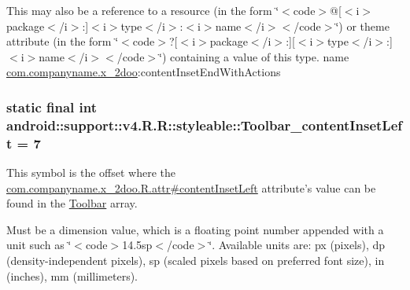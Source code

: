 This may also be a reference to a resource (in the form \char`\"{}$<$code$>$@\mbox{[}$<$i$>$package$<$/i$>$:\mbox{]}$<$i$>$type$<$/i$>$:$<$i$>$name$<$/i$>$$<$/code$>$\char`\"{}) or theme attribute (in the form \char`\"{}$<$code$>$?\mbox{[}$<$i$>$package$<$/i$>$:\mbox{]}\mbox{[}$<$i$>$type$<$/i$>$:\mbox{]}$<$i$>$name$<$/i$>$$<$/code$>$\char`\"{}) containing a value of this type.  name \hyperlink{namespacecom_1_1companyname_1_1x__2doo}{com.companyname.x\_\-2doo}:contentInsetEndWithActions \hypertarget{classandroid_1_1support_1_1v4_1_1_r_1_1styleable_58d0345a39808d32a1f60119991bb07e}{
\subsubsection[{Toolbar\_\-contentInsetLeft}]{\setlength{\rightskip}{0pt plus 5cm}static final int android::support::v4.R.R::styleable::Toolbar\_\-contentInsetLeft = 7}}
\label{classandroid_1_1support_1_1v4_1_1_r_1_1styleable_58d0345a39808d32a1f60119991bb07e}


This symbol is the offset where the \hyperlink{classcom_1_1companyname_1_1x__2doo_1_1_r_1_1attr_6c3ee0e73b74ea9e227ad51936654195}{com.companyname.x\_\-2doo.R.attr\#contentInsetLeft} attribute's value can be found in the \hyperlink{classandroid_1_1support_1_1v4_1_1_r_1_1styleable_0646d71cfbd4a8645c7d805b33e1c574}{Toolbar} array.

Must be a dimension value, which is a floating point number appended with a unit such as \char`\"{}$<$code$>$14.5sp$<$/code$>$\char`\"{}. Available units are: px (pixels), dp (density-independent pixels), sp (scaled pixels based on preferred font size), in (inches), mm (millimeters). 

